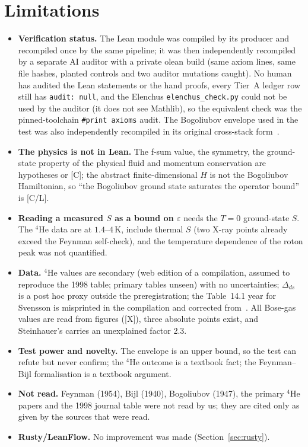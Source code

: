 \documentclass[11pt]{article}
\theoremstyle{remark}
\newcommand{\tier}[1]{\textsf{[#1]}}
\newcommand{\lean}[1]{\texttt{#1}}
\newcommand{\eps}{\varepsilon}
\begin{document}
\section{Limitations}\label{sec:lim}
\begin{itemize}
\item \textbf{Verification status.} The Lean module was compiled by its producer and recompiled once by the same pipeline; it was then independently recompiled by a separate AI auditor with a private olean build (same axiom lines, same file hashes, planted controls and two auditor mutations caught). No human has audited the Lean statements or the hand proofs, every Tier~A ledger row still has \texttt{audit: null}, and the Elenchus \texttt{elenchus\_check.py} could not be used by the auditor (it does not see Mathlib), so the equivalent check was the pinned-toolchain \lean{\#print axioms} audit. The Bogoliubov envelope used in the test was also independently recompiled in its original cross-stack form~\cite{bsk}.
\item \textbf{The physics is not in Lean.} The f-sum value, the symmetry, the ground-state property of the physical fluid and momentum conservation are hypotheses or \tier{C}; the abstract finite-dimensional $H$ is not the Bogoliubov Hamiltonian, so ``the Bogoliubov ground state saturates the operator bound'' is \tier{C/L}.
\item \textbf{Reading a measured $S$ as a bound on $\eps$} needs the $T=0$ ground-state $S$. The $^4$He data are at $1.4$--$4$\,K, include thermal $S$ (two X-ray points already exceed the Feynman self-check), and the temperature dependence of the roton peak was not quantified.
\item \textbf{Data.} $^4$He values are secondary (web edition of a compilation, assumed to reproduce the 1998 table; primary tables unseen) with no uncertainties; $\Delta_{ds}$ is a post hoc proxy outside the preregistration; the Table~14.1 year for Svensson is misprinted in the compilation and corrected from~\cite{mg}. All Bose-gas values are read from figures (\tier{X}), three absolute points exist, and Steinhauer's carries an unexplained factor 2.3.
\item \textbf{Test power and novelty.} The envelope is an upper bound, so the test can refute but never confirm; the $^4$He outcome is a textbook fact; the Feynman--Bijl formalisation is a textbook argument.
\item \textbf{Not read.} Feynman (1954), Bijl (1940), Bogoliubov (1947), the primary $^4$He papers and the 1998 journal table were not read by us; they are cited only as given by the sources that were read.
\item \textbf{Rusty/LeanFlow.} No improvement was made (Section~\ref{sec:rusty}).
\end{itemize}
\end{document}
